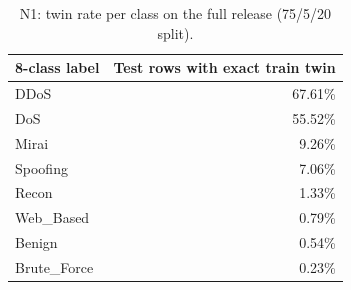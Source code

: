 \begin{table}[!t]
\centering
\caption{N1: twin rate per class on the full release (75/5/20 split).}\label{tab:n1}
\scriptsize
\setlength{\tabcolsep}{3pt}
\begin{tabular}{lr}
\toprule
\textbf{8-class label} & \textbf{Test rows with exact train twin} \\
\midrule
DDoS & 67.61\% \\
DoS & 55.52\% \\
Mirai & 9.26\% \\
Spoofing & 7.06\% \\
Recon & 1.33\% \\
Web\_Based & 0.79\% \\
Benign & 0.54\% \\
Brute\_Force & 0.23\% \\
\bottomrule
\end{tabular}
\end{table}
